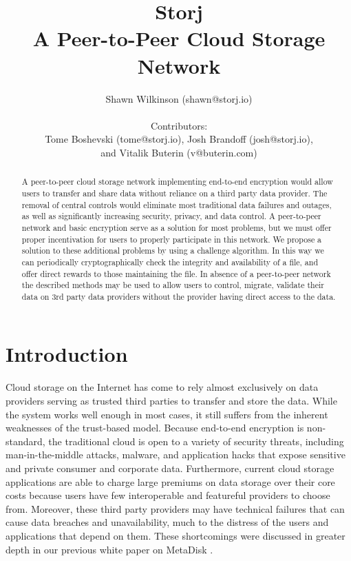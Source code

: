\documentclass[a4paper,10pt]{article}
\begin{document}
\lstset{basicstyle=\ttfamily\footnotesize,breaklines=true}
\lstset{numbers=left, numberstyle=\tiny, stepnumber=1, numbersep=5pt}
\lstset{language=TeX}

\title{\textbf{Storj\\A Peer-to-Peer Cloud Storage Network}}
\author{Shawn Wilkinson (shawn@storj.io)\\
\\Contributors:\\ 
Tome Boshevski (tome@storj.io), Josh Brandoff (josh@storj.io),\\ 
and Vitalik Buterin (v@buterin.com)}
\maketitle
\begin{abstract}
A peer-to-peer cloud storage network implementing end-to-end encryption would allow users to transfer and share data without reliance on a third party data provider. The removal of central controls would eliminate most traditional data failures and outages, as well as significantly increasing security, privacy, and data control. A peer-to-peer network and basic encryption serve as a solution for most problems, but we must offer proper incentivation for users to properly participate in this network. We propose a solution to these additional problems by using a challenge algorithm. In this way we can periodically cryptographically check the integrity and availability of a file, and offer direct rewards to those maintaining the file. In absence of a peer-to-peer network the described methods may be used to allow users to control, migrate, validate their data on 3rd party data providers without the provider having direct access to the data. 
\end{abstract}

\section{Introduction}
Cloud storage on the Internet has come to rely almost exclusively on data providers serving as trusted third parties to transfer and store the data. While the system works well enough in most cases, it still suffers from the inherent weaknesses of the trust-based model. Because end-to-end encryption is non-standard, the traditional cloud is open to a variety of security threats, including man-in-the-middle attacks, malware, and application hacks that expose sensitive and private consumer and corporate data. Furthermore, current cloud storage applications are able to charge large premiums on data storage over their core costs because users have few interoperable and featureful providers to choose from. Moreover, these third party providers may have technical failures that can cause data breaches and unavailability, much to the distress of the users and applications that depend on them. These shortcomings were discussed in greater depth in our previous white paper on MetaDisk \cite{1}.\\
\end{document}
